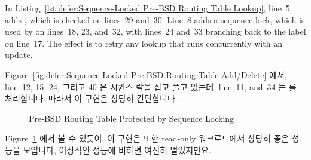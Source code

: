 In
Listing~\ref{lst:defer:Sequence-Locked Pre-BSD Routing Table Lookup},
line~5 adds , which is checked on lines~29 and~30.
Line~8 adds a sequence lock, which is used by 
on lines~18, 23, and~32, with lines~24 and~33 branching back to
the  label on line~17.
The effect is to retry any lookup that runs concurrently with an update.
\fi

Figure~\ref{fig:defer:Sequence-Locked Pre-BSD Routing Table Add/Delete} 에서,
line~12, 15, 24, 그리고 40 은 시퀀스 락을 잡고 풀고 있는데, line~11, and~34 는
 를 처리합니다.
따라서 이 구현은 상당히 간단합니다.

\begin{figure}[tb]
\centering
{}
\caption{Pre-BSD Routing Table Protected by Sequence Locking}
\label{fig:defer:Pre-BSD Routing Table Protected by Sequence Locking}
\end{figure}

Figure~\ref{fig:defer:Pre-BSD Routing Table Protected by Sequence Locking} 에서 볼 수 있듯이,
이 구현은 또한 read-only 워크로드에서 상당히 좋은 성능을 보입니다, 이상적인 성능에 비하면 여전히 멀었지만요.


